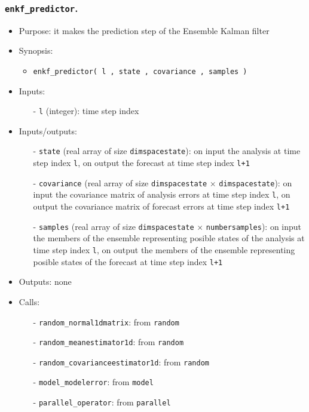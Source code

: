 \documentclass[12pt]{article}
\begin{document}
\subsubsection{{\tt enkf\_predictor}.}
\begin{itemize}
\item Purpose: it makes the prediction step of the Ensemble Kalman filter
\item Synopsis: 
\begin{itemize}
\item {\tt enkf\_predictor( l , state , covariance , samples )} 
\end{itemize}
\item Inputs: 
\begin{itemize}
\item[-] {\tt l} (integer): time step index
\end{itemize}
\item Inputs/outputs: 
\begin{itemize}
\item[-] {\tt state} (real array of size {\tt dimspacestate}): on input the analysis at time step index {\tt l}, on output the forecast at time step index {\tt l+1}
\item[-] {\tt covariance} (real array of size {\tt dimspacestate} $\times$ {\tt dimspacestate}): on input the covariance matrix of analysis errors at time step index {\tt l}, on output the covariance matrix of forecast errors at time step index {\tt l+1}
\item[-] {\tt samples} (real array of size {\tt dimspacestate} $\times$ {\tt numbersamples}): on input the members of the ensemble representing posible states of the analysis at time step index {\tt l}, on output the members of the ensemble representing posible states of the forecast at time step index {\tt l+1}
\end{itemize}
\item Outputs: none
\item Calls: 
\begin{itemize}
\item[-] {\tt random\_normal1dmatrix}: from {\tt random}
\item[-] {\tt random\_meanestimator1d}: from {\tt random}
\item[-] {\tt random\_covarianceestimator1d}: from {\tt random}
\item[-] {\tt model\_modelerror}: from {\tt model}
\item[-] {\tt parallel\_operator}: from {\tt parallel}
\end{itemize}
\end{itemize} 
\end{document}
